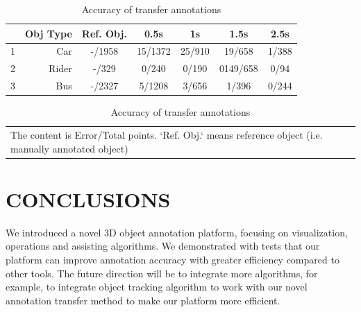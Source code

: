 \documentclass[letterpaper, 10 pt, conference]{ieeeconf}  %
\begin{document}
\begin{table}[h]
	\centering
	\caption{Accuracy of transfer annotations}
	\label{tab:transfer-evaluation}
	\begin{tabular}{|c|r|c|c|c|c|c|}
		\hline
		 & \textbf{Obj Type} & \textbf{Ref. Obj.}&\textbf{0.5s} & \textbf{1s} & \textbf{1.5s}& \textbf{2.5s} \\
		\hline
		\hline
		 1 & Car &-/1958& 15/1372 & 25/910 & 19/658 &  1/388\\
		\hline
  		 2 & Rider &-/329& 0/240 & 0/190 & 0149/658 &  0/94\\
		\hline
  		 3 & Bus &-/2327& 5/1208 & 3/656 & 1/396 &  0/244\\
\hline
	\end{tabular}

\begin{tabular}{p{\linewidth}}
	The content is Error/Total points. `Ref. Obj.` means reference object (i.e. manually annotated object)
\end{tabular}


\end{table}


\section{CONCLUSIONS}
\label{conclusions}

We introduced a novel 3D object annotation platform, focusing on visualization, operations and assisting algorithms. We demonstrated with tests that our platform can improve annotation accuracy with greater efficiency compared to other tools. The future direction will be to integrate more algorithms, for example, to integrate object tracking algorithm to work with our novel annotation transfer method to make our platform more efficient.



\addtolength{\textheight}{-12cm}   %

\end{document}
